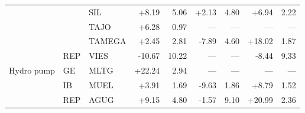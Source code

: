 \begin{tabular}{l l l r r r r r r}
 &  & SIL & +8.19 & 5.06 & +2.13 & 4.80 & +6.94 & 2.22 \\
 &  & TAJO & +6.28 & 0.97 & --- & --- & --- & --- \\
 &  & TAMEGA & +2.45 & 2.81 & -7.89 & 4.60 & +18.02 & 1.87 \\
 & REP & VIES & -10.67 & 10.22 & --- & --- & -8.44 & 9.33 \\
\addlinespace
Hydro pump & GE & MLTG & +22.24 & 2.94 & --- & --- & --- & --- \\
 & IB & MUEL & +3.91 & 1.69 & -9.63 & 1.86 & +8.79 & 1.52 \\
 & REP & AGUG & +9.15 & 4.80 & -1.57 & 9.10 & +20.99 & 2.36 \\
\bottomrule
\end{tabular}